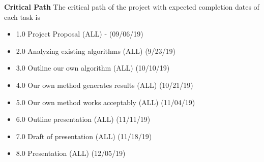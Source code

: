 \documentclass[11pt, a4paper]{article}
\begin{document}
    
    \textbf{Critical Path}
    The critical path of the project with expected completion dates of each task is
    \begin{itemize}
        \item 1.0 Project Proposal (ALL) - (09/06/19)
        \item 2.0 Analyzing existing algorithms (ALL) (9/23/19)
        \item 3.0 Outline our own algorithm (ALL) (10/10/19)
        \item 4.0 Our own method generates results (ALL) (10/21/19)
        \item 5.0 Our own method works acceptably (ALL) (11/04/19)
        \item 6.0 Outline presentation (ALL) (11/11/19)
        \item 7.0 Draft of presentation (ALL) (11/18/19)
        \item 8.0 Presentation (ALL) (12/05/19)
        
    \end{itemize}


        

    \pagebreak
        
    
\end{document}
